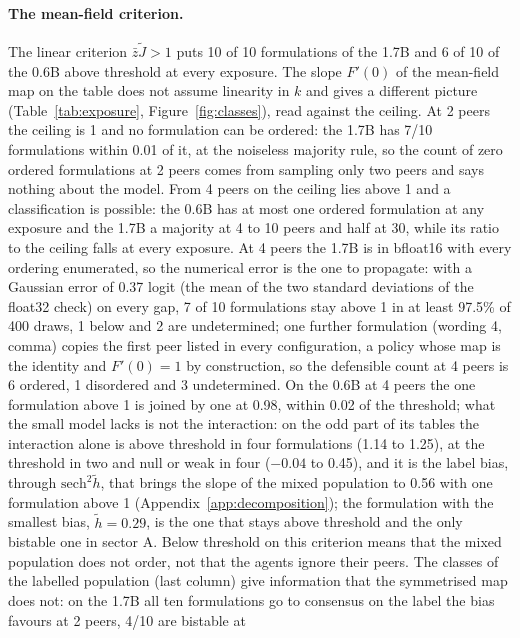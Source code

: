 \documentclass[11pt]{article}
\begin{document}
\paragraph{The mean-field criterion.} The linear criterion $\bar z\tilde J>1$
puts 10 of 10 formulations of the 1.7B and 6 of 10 of the 0.6B above
threshold at every exposure. The slope $F'(0)$ of the mean-field map on the
table does not assume linearity in $k$ and gives a different picture
(Table~\ref{tab:exposure}, Figure~\ref{fig:classes}), read against the
ceiling. At 2 peers the ceiling is 1 and no formulation can be ordered:
the 1.7B has 7/10 formulations within 0.01 of it, at the noiseless
majority rule, so the count of zero ordered formulations at 2 peers comes from sampling only two peers and says nothing about the model. From 4 peers on the ceiling lies above 1 and a classification is possible: the 0.6B has at most one ordered formulation at any
exposure and the 1.7B a majority at 4 to 10 peers and half at 30, while
its ratio to the ceiling falls at every exposure. At 4 peers the 1.7B is
in bfloat16 with every ordering enumerated, so the numerical error is the
one to propagate: with a Gaussian error of 0.37 logit (the mean of the two
standard deviations of the float32 check) on every gap, 7 of
10 formulations stay above 1 in at least 97.5\% of 400 draws, 1 below and
2 are undetermined; one further formulation (wording 4, comma) copies
the first peer listed in every configuration, a policy whose map is the
identity and $F'(0) = 1$ by construction, so the defensible count at 4
peers is 6 ordered, 1 disordered and 3 undetermined. On the 0.6B at 4 peers the one formulation above 1 is joined by one at 0.98, within 0.02 of the threshold; what the small model lacks is not the interaction: on the odd part of its tables the interaction alone is above threshold in four formulations (1.14 to 1.25), at the threshold in two and null or weak in four ($-0.04$ to 0.45), and it is the label bias, through $\mathrm{sech}^2\tilde h$, that brings the slope of the mixed population to 0.56 with one formulation above 1 (Appendix~\ref{app:decomposition}); the formulation with the smallest bias, $\tilde h = 0.29$, is the one that stays above threshold and the only bistable one in sector A. Below threshold on this criterion means that the mixed population does not order, not that the agents ignore their peers. The classes of the labelled population (last column) give information that the symmetrised map does not: on the 1.7B all ten formulations go to
consensus on the label the bias favours at 2 peers, 4/10 are bistable at
\end{document}
